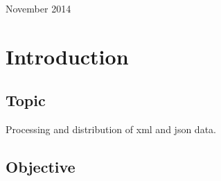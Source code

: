 \documentclass[12pt]{article}
\begin{document}
\begin{titlepage}
\begin{center}
      \vspace{5 mm}


      {\large November 2014}\\[3cm] %




      \vfill %
      \end{center}
      \end{titlepage}



  \section{Introduction}

  \subsection{Topic}

  Processing and distribution of xml and json data.

  \subsection{Objective}
\end{document}
